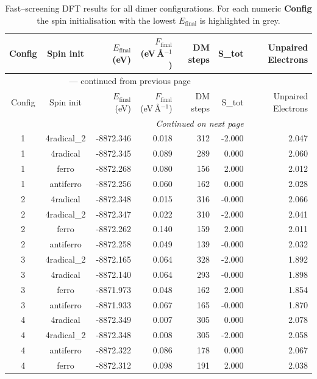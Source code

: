 
\begin{longtable}{@{}ccrrrrr@{}}
\caption{Fast–screening DFT results for all dimer configurations.
         For each numeric \textbf{Config} the spin initialisation with the
         lowest $E_{\mathrm{final}}$ is highlighted in grey.}\label{tab:dimer_full}\\
\toprule
Config & Spin init & $E_{\mathrm{final}}$ (eV) &
$F_{\mathrm{final}}$ (eV\,\AA$^{-1}$) & DM steps & S_{tot} & Unpaired Electrons\\
\midrule
\endfirsthead
\multicolumn{6}{c}{{\tablename}~\thetable{} — continued from previous page}\\
\toprule
Config & Spin init & $E_{\mathrm{final}}$ (eV) &
$F_{\mathrm{final}}$ (eV\,\AA$^{-1}$) & DM steps & S_{tot} & Unpaired Electrons\\
\midrule
\endhead
\midrule
\multicolumn{6}{r}{\emph{Continued on next page}}\\
\endfoot
\bottomrule
\endlastfoot
\rowcolor{gray!20} 1 & 4radical\_2 & -8872.346 & 0.018 & 312 & -2.000 & 2.047 \\
1 & 4radical & -8872.345 & 0.089 & 289 & 0.000 & 2.060 \\
1 & ferro & -8872.268 & 0.080 & 156 & 2.000 & 2.012 \\
1 & antiferro & -8872.256 & 0.060 & 162 & 0.000 & 2.028 \\
\rowcolor{gray!20} 2 & 4radical & -8872.348 & 0.015 & 316 & -0.000 & 2.066 \\
2 & 4radical\_2 & -8872.347 & 0.022 & 310 & -2.000 & 2.041 \\
2 & ferro & -8872.262 & 0.140 & 159 & 2.000 & 2.011 \\
2 & antiferro & -8872.258 & 0.049 & 139 & -0.000 & 2.032 \\
\rowcolor{gray!20} 3 & 4radical\_2 & -8872.165 & 0.064 & 328 & -2.000 & 1.892 \\
3 & 4radical & -8872.140 & 0.064 & 293 & -0.000 & 1.898 \\
3 & ferro & -8871.973 & 0.048 & 162 & 2.000 & 1.854 \\
3 & antiferro & -8871.933 & 0.067 & 165 & -0.000 & 1.870 \\
\rowcolor{gray!20} 4 & 4radical & -8872.349 & 0.007 & 305 & 0.000 & 2.078 \\
4 & 4radical\_2 & -8872.348 & 0.008 & 305 & -2.000 & 2.058 \\
4 & antiferro & -8872.322 & 0.086 & 178 & 0.000 & 2.067 \\
4 & ferro & -8872.312 & 0.098 & 191 & 2.000 & 2.038 \\

\end{longtable}

